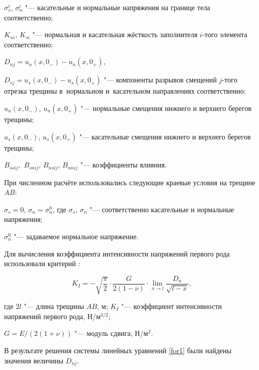 $\sigma^{i}_{s}$, $\sigma^{i}_{n}$ "--- касательные и нормальные напряжения на границе тела  соответственно;

$K_{ni}$, $K_{si}$ "--- нормальная и касательная жёсткость заполнителя $i$-того  элемента соответственно;

$D_{nj}=u_{n}(x, 0_{-})-u_{n}(x, 0_{+})$, 

$D_{sj}=u_{s}(x, 0_{-})-u_{s}(x, 0_{+})$ "---  компоненты разрывов смещений $j$-того отрезка трещины  в~нормальном и~касательном направлениях соответственно;

$u_{n}(x, 0_{-})$, $u_{n}(x, 0_{+})$ "--- нормальные смещения нижнего и верхнего берегов трещины;

$u_{s}(x, 0_{-})$, $u_{s}(x, 0_{+})$ "--- касательные смещения нижнего и верхнего берегов трещины;

$B_{ssij},$ $B_{snij}$, $B_{nsij}$, $B_{nnij}$ "--- коэффициенты влияния. 



При численном расчёте использовались следующие краевые условия на трещине $AB$:

$\sigma_{s}=0$, $\sigma_{n}=\sigma^{0}_{n}$, где $\sigma_{s}$, $\sigma_{n}$ "--- соответственно касательные и нормальные напряжения; 

$\sigma^{0}_{n}$ "--- задаваемое нормальное напряжение.

Для вычисления коэффициента интенсивности напряжений первого рода использовали критерий \cite{SpirBel:bib:Linkov}:

\begin{equation}

\label{for2}

K_{I}=-\sqrt{\frac{\pi}{2}} \cdot \frac{G}{2(1-\nu)} \cdot \lim_{x\rightarrow l}\frac{D_{n}}{\sqrt{l-x}},

\end{equation}

где  $2l$ "--- длина трещины $AB$, м; $K_{I}$ "--- коэффициент интенсивности напряжений первого рода, Н/м$^{3/2}$; 

$G={E}/({2(1+\nu)})$ "--- модуль сдвига, Н/м$^{2}$.



 

 \smallskip




В результате решения системы линейных уравнений \eqref{for1} были найдены значения величины $D_{nj}.$

